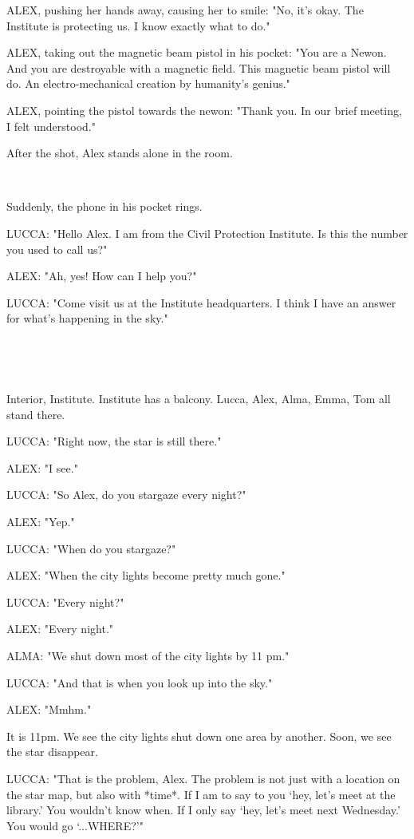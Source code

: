 \documentclass[11pt]{article}
\begin{document}
ALEX, pushing her hands away, causing her to smile: "No, it's okay. 
The Institute is protecting us.
I know exactly what to do."

ALEX, taking out the magnetic beam pistol in his pocket: "You are a Newon.
And you are destroyable with a magnetic field.
This magnetic beam pistol will do.
An electro-mechanical creation by humanity's genius."

ALEX, pointing the pistol towards the newon: "Thank you.
In our brief meeting, I felt understood."

After the shot, Alex stands alone in the room. 

\ 

Suddenly, the phone in his pocket rings.

LUCCA: "Hello Alex. I am from the Civil Protection Institute.
Is this the number you used to call us?"

ALEX: "Ah, yes! How can I help you?"

LUCCA: "Come visit us at the Institute headquarters. 
I think I have an answer for what's happening in the sky."

\ 

\ 

Interior, Institute.
Institute has a balcony.
Lucca, Alex, Alma, Emma, Tom all stand there.

LUCCA: "Right now, the star is still there."

ALEX: "I see."

LUCCA: "So Alex, do you stargaze every night?"

ALEX: "Yep."

LUCCA: "When do you stargaze?"

ALEX: "When the city lights become pretty much gone."

LUCCA: "Every night?"

ALEX: "Every night."

ALMA: "We shut down most of the city lights by 11 pm."

LUCCA: "And that is when you look up into the sky."

ALEX: "Mmhm."

It is 11pm. 
We see the city lights shut down one area by another.
Soon, we see the star disappear.

LUCCA: "That is the problem, Alex.
The problem is not just with a location on the star map, but also with *time*.
If I am to say to you `hey, let's meet at the library.'
You wouldn't know when.
If I only say `hey, let's meet next Wednesday.'
You would go `...WHERE?'"
\end{document}
